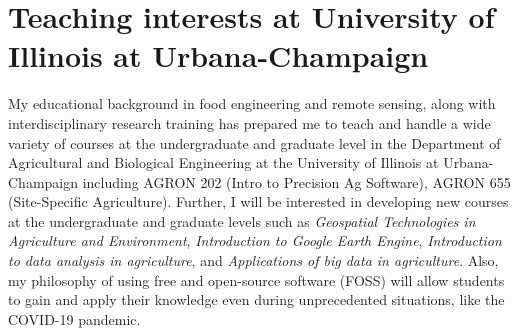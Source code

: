 \documentclass[11pt]{article}
\begin{document}
{\vspace{1em}
\section*{Teaching interests at University of Illinois at Urbana-Champaign}
\vspace{-0.8em}
\hspace{1em} 
My educational background in food engineering and remote sensing, along with interdisciplinary research training has prepared me to teach and handle a wide variety of courses at the undergraduate and graduate level in the Department of Agricultural and Biological Engineering at the University of Illinois at Urbana-Champaign including AGRON 202 (Intro to Precision Ag Software), AGRON 655 (Site-Specific Agriculture). Further, I will be interested in developing new courses at the undergraduate and graduate levels such as \emph{Geospatial Technologies in Agriculture and Environment}, \emph{Introduction to Google Earth Engine}, \emph{Introduction to data analysis in agriculture}, and \emph{Applications of big data in agriculture}. Also, my philosophy of using free and open-source software (FOSS) will allow students to gain and apply their knowledge even during unprecedented situations, like the COVID-19 pandemic. 


%
%



}
\end{document}

